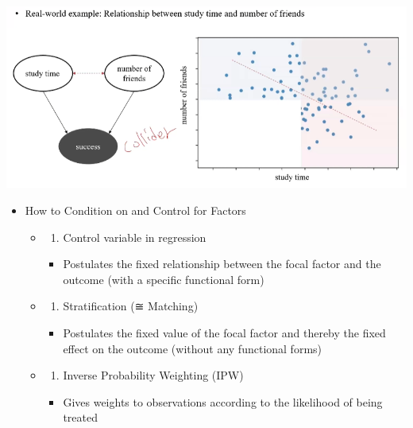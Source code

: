 \documentclass[
]{book}
\providecommand{\tightlist}{%
  \setlength{\itemsep}{0pt}\setlength{\parskip}{0pt}}
\theoremstyle{definition}
\theoremstyle{definition}
\theoremstyle{definition}
\theoremstyle{definition}
\theoremstyle{remark}
\begin{document}
\includegraphics{figures/54.png}

\begin{itemize}
\tightlist
\item
  How to Condition on and Control for Factors

  \begin{itemize}
  \item
    \begin{enumerate}
    \def\labelenumi{(\arabic{enumi})}
    \tightlist
    \item
      Control variable in regression
    \end{enumerate}

    \begin{itemize}
    \tightlist
    \item
      Postulates the fixed relationship between the focal factor and the outcome (with a specific functional form)
    \end{itemize}
  \item
    \begin{enumerate}
    \def\labelenumi{(\arabic{enumi})}
    \setcounter{enumi}{1}
    \tightlist
    \item
      Stratification (≅ Matching)
    \end{enumerate}

    \begin{itemize}
    \tightlist
    \item
      Postulates the fixed value of the focal factor and thereby the fixed effect on the outcome (without any functional forms)
    \end{itemize}
  \item
    \begin{enumerate}
    \def\labelenumi{(\arabic{enumi})}
    \setcounter{enumi}{2}
    \tightlist
    \item
      Inverse Probability Weighting (IPW)
    \end{enumerate}

    \begin{itemize}
    \tightlist
    \item
      Gives weights to observations according to the likelihood of being treated
    \end{itemize}
  \end{itemize}
\end{itemize}
\end{document}
